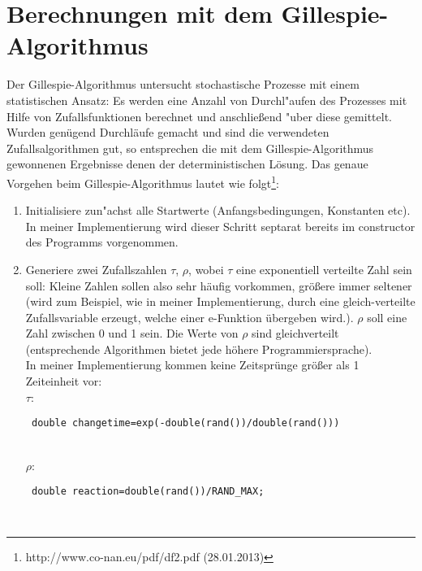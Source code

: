 \documentclass[11pt]{article}
\begin{document}
\section{Berechnungen mit dem Gillespie-Algorithmus}
Der Gillespie-Algorithmus untersucht stochastische Prozesse mit einem statistischen Ansatz: Es werden eine Anzahl von Durchl"aufen des Prozesses mit Hilfe von Zufallsfunktionen berechnet und anschließend "uber diese gemittelt. Wurden genügend Durchläufe gemacht und sind die verwendeten Zufallsalgorithmen gut, so entsprechen die mit dem Gillespie-Algorithmus gewonnenen Ergebnisse denen der deterministischen Lösung. Das genaue Vorgehen beim Gillespie-Algorithmus lautet wie folgt\footnote{http://www.co-nan.eu/pdf/df2.pdf (28.01.2013) }:
\begin{enumerate}
   \item Initialisiere zun"achst alle Startwerte (Anfangsbedingungen, Konstanten etc). In meiner Implementierung wird dieser Schritt septarat bereits im constructor des Programms vorgenommen.
   \item Generiere zwei Zufallszahlen $\tau$, $\rho$, wobei $\tau$ eine exponentiell verteilte Zahl sein soll: Kleine Zahlen sollen also sehr häufig vorkommen, größere immer seltener (wird zum Beispiel, wie in meiner Implementierung, durch eine gleich-verteilte Zufallsvariable erzeugt, welche einer e-Funktion übergeben wird.). $\rho$ soll eine Zahl zwischen 0 und 1 sein. Die Werte von $\rho$ sind gleichverteilt (entsprechende Algorithmen bietet jede höhere Programmiersprache).\\
    In meiner Implementierung kommen keine Zeitsprünge größer als 1 Zeiteinheit vor:\\
   
         $\tau$: \begin{verbatim} double changetime=exp(-double(rand())/double(rand()))\end{verbatim}\\

         $\rho$: \begin{verbatim} double reaction=double(rand())/RAND_MAX;\end{verbatim}\\


\end{enumerate}
\end{document}
